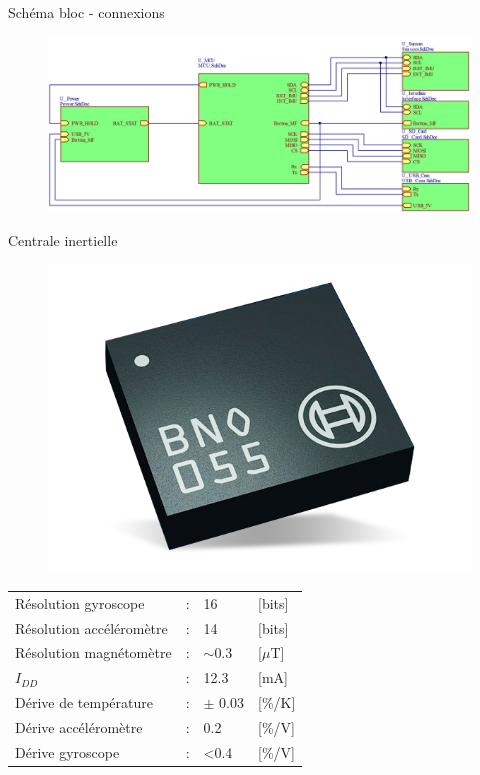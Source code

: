 \documentclass[compress,aspectratio=169]{beamer}
\begin{document}
\begin{frame}[containsverbatim]{Schéma bloc - connexions}
	\begin{figure}[h]
		\centering
		\includegraphics[width=1\linewidth]{Images/Altium-blocks}
	\end{figure}
\end{frame}

\begin{frame}[containsverbatim]{Centrale inertielle}
	\begin{figure}
		\centering
		\includegraphics[width=0.3\linewidth]{Images/BNO055-Illustration}
	\end{figure}
	\begin{tabular}{l l l l}
		Résolution gyroscope & : & 16 & [bits] \\
		Résolution accéléromètre & : & 14 & [bits] \\
		Résolution magnétomètre & : & $\sim$0.3 & [$\mu$T] \\
		$I_{DD}$ & : & 12.3 & [mA] \\
		Dérive de température & : & $\pm$ 0.03 & [\%/K] \\ 
		Dérive accéléromètre & : & 0.2 & [\%/V] \\
		Dérive gyroscope & : & <0.4 & [\%/V]
	\end{tabular} \\
\end{frame}
\end{document}
